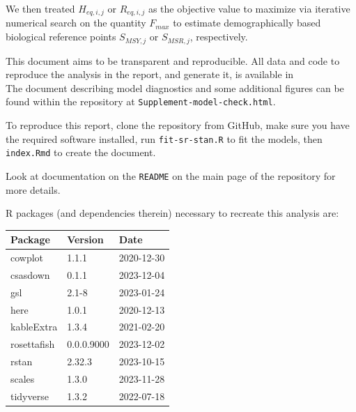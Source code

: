 \documentclass[11pt]{book}
\begin{document}
We then treated \(H_{eq,i,j}\) or \(R_{eq,i,j}\) as the objective value to maximize via iterative numerical search on the quantity \(F_{max}\) to estimate demographically based biological reference points \(S_{MSY,j}\) or \(S_{MSR,j}\), respectively.


\clearpage

\label{app:fourth-appendix}


\clearpage

\label{app:fifth-appendix}

This document aims to be transparent and reproducible. All data and code to reproduce the analysis in the report, and generate it, is available in  \\
The document describing model diagnostics and some additional figures can be found within the repository at \texttt{Supplement-model-check.html}.

To reproduce this report, clone the repository from GitHub, make sure you have the required software installed, run \texttt{fit-sr-stan.R} to fit the models, then \texttt{index.Rmd} to create the document.

Look at documentation on the \texttt{README} on the main page of the repository for more details.

R packages (and dependencies therein) necessary to recreate this analysis are:
\begin{longtable}[]{@{}lll@{}}
\toprule()
Package & Version & Date \\
\midrule()
\endhead
cowplot & 1.1.1 & 2020-12-30 \\
csasdown & 0.1.1 & 2023-12-04 \\
gsl & 2.1-8 & 2023-01-24 \\
here & 1.0.1 & 2020-12-13 \\
kableExtra & 1.3.4 & 2021-02-20 \\
rosettafish & 0.0.0.9000 & 2023-12-02 \\
rstan & 2.32.3 & 2023-10-15 \\
scales & 1.3.0 & 2023-11-28 \\
tidyverse & 1.3.2 & 2022-07-18 \\
\bottomrule()
\end{longtable}
\end{document}
